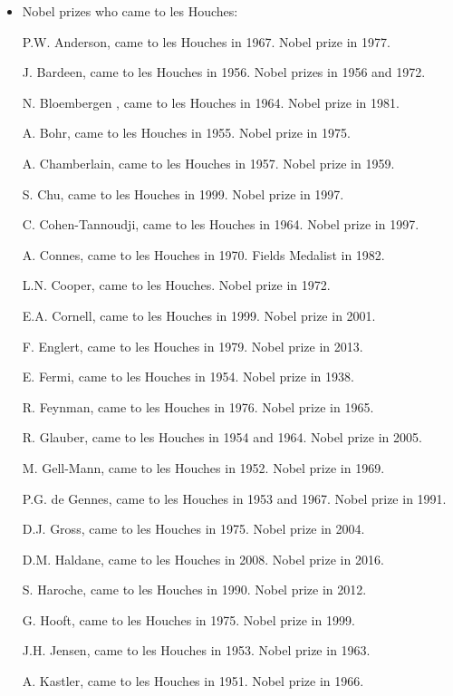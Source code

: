 \newpage

\begin{itemize}
\item  Nobel prizes who came to les Houches:

\begin{multicols}{2}
{\footnotesize
P.W. Anderson,
came to les Houches in 1967. Nobel prize in 1977.

J. Bardeen,
came to les Houches in 1956. Nobel prizes in 1956 and 1972.

N. Bloembergen ,
came to les Houches in 1964. Nobel prize in 1981.

A. Bohr,
came to les Houches in 1955. Nobel prize in 1975.

A. Chamberlain,
came to les Houches in 1957. Nobel prize in 1959.

S. Chu,
came to les Houches in 1999. Nobel prize in 1997.

C. Cohen-Tannoudji,
came to les Houches in 1964. Nobel prize in 1997.

A. Connes,
came to les Houches in 1970. Fields Medalist in 1982.

L.N. Cooper,
came to les Houches. Nobel prize in 1972.

E.A. Cornell,
came to les Houches in 1999. Nobel prize in 2001.

F. Englert,
came to les Houches in 1979. Nobel prize in 2013.

E. Fermi,
came to les Houches in 1954. Nobel prize in 1938.

R. Feynman,
came to les Houches in 1976. Nobel prize in 1965.

R. Glauber,
came to les Houches in 1954 and 1964. Nobel prize in 2005.

M. Gell-Mann,
came to les Houches in 1952. Nobel prize in 1969.

P.G. de Gennes,
came to les Houches in 1953 and 1967. Nobel prize in 1991.

D.J. Gross,
came to les Houches in 1975. Nobel prize in 2004.

D.M. Haldane,
came to les Houches in 2008. Nobel prize in 2016.

S. Haroche,
came to les Houches in 1990. Nobel prize in 2012.

G. Hooft,
came to les Houches in 1975. Nobel prize in 1999.

J.H. Jensen,
came to les Houches in 1953. Nobel prize in 1963.

A. Kastler,
came to les Houches in 1951. Nobel prize in 1966.

}
\end{multicols}
\end{itemize}
